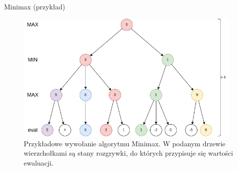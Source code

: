 \begin{frame}{Minimax (przykład)}
	
	\begin{figure}
		\centering
		\includegraphics[width=11cm]{figures/minimax3.png}
		\caption{Przykładowe wywołanie algorytmu Minimax. W podanym drzewie wierzchołkami są stany rozgrywki, do których przypisuje się wartości ewaluacji.}
	\end{figure}

\end{frame}

